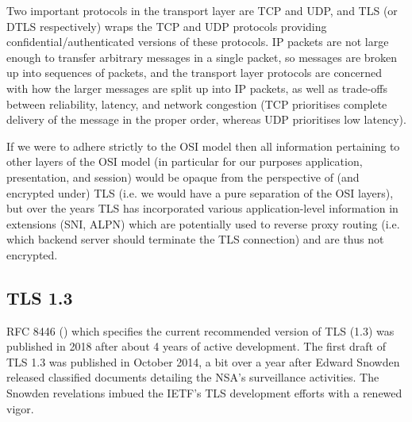 Two important protocols in the transport layer are \ac{TCP} and \ac{UDP}, and \ac{TLS} (or \ac{DTLS} respectively) wraps the TCP and UDP protocols providing confidential/authenticated versions of these protocols. IP packets are not large enough to transfer arbitrary messages in a single packet, so messages are broken up into sequences of packets, and the transport layer protocols are concerned with how the larger messages are split up into IP packets, as well as trade-offs between reliability, latency, and network congestion (TCP prioritises complete delivery of the message in the proper order, whereas UDP prioritises low latency).


If we were to adhere strictly to the \ac{OSI} model then all information pertaining to other layers of the \ac{OSI} model (in particular for our purposes application, presentation, and session) would be opaque from the perspective of (and encrypted under) TLS (i.e. we would have a pure separation of the \ac{OSI} layers), but over the years \ac{TLS} has incorporated various application-level information in extensions (\ac{SNI}, \ac{ALPN}) which are potentially used to reverse proxy routing (i.e. which
backend server should terminate the \ac{TLS} connection) and are thus not encrypted.

\subsection{TLS 1.3}

\ac{RFC} 8446 (\citep{rfc8446}) which specifies the current recommended version of \ac{TLS} (1.3)
was published in 2018 after about 4 years
of active development.
The first draft of \ac{TLS} 1.3 was published
in October 2014, a bit over a year after
Edward Snowden released classified documents
detailing the \ac{NSA}'s surveillance activities.
The Snowden revelations imbued the \ac{IETF}'s
\ac{TLS} development efforts with a renewed vigor.


